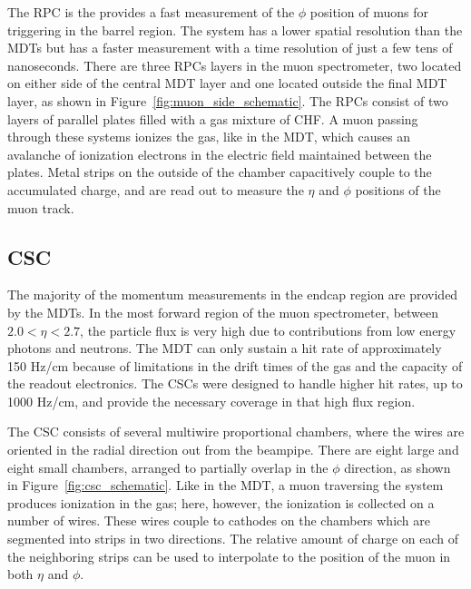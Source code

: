 The \ac{RPC} is the provides a fast measurement of the $\phi$ position of muons for triggering in the barrel region.
The system has a lower spatial resolution than the \acp{MDT} but has a faster measurement with a time resolution of just a few tens of nanoseconds.
There are three \acp{RPC} layers in the muon spectrometer, two located on either side of the central \ac{MDT} layer and one located outside the final \ac{MDT} layer, as shown in Figure~\ref{fig:muon_side_schematic}.
The \acp{RPC} consist of two layers of parallel plates filled with a gas mixture of CHF.
A muon passing through these systems ionizes the gas, like in the \ac{MDT}, which causes an avalanche of ionization electrons in the electric field maintained between the plates.
Metal strips on the outside of the chamber capacitively couple to the accumulated charge, and are read out to measure the $\eta$ and $\phi$ positions of the muon track. 

\subsection{\acl{CSC}}
The majority of the momentum measurements in the endcap region are provided by the \acp{MDT}.
In the most forward region of the muon spectrometer, between $2.0 < \eta < 2.7$, the particle flux is very high due to contributions from low energy photons and neutrons.
The \ac{MDT} can only sustain a hit rate of approximately 150 Hz/cm because of limitations in the drift times of the gas and the capacity of the readout electronics. 
The \acp{CSC} were designed to handle higher hit rates, up to 1000 Hz/cm, and provide the necessary coverage in that high flux region.

The \ac{CSC} consists of several multiwire proportional chambers, where the wires are oriented in the radial direction out from the beampipe.
There are eight large and eight small chambers, arranged to partially overlap in the $\phi$ direction, as shown in Figure~\ref{fig:csc_schematic}.
Like in the \ac{MDT}, a muon traversing the system produces ionization in the gas; here, however, the ionization is collected on a number of wires.
These wires couple to cathodes on the chambers which are segmented into strips in two directions.
The relative amount of charge on each of the neighboring strips can be used to interpolate to the position of the muon in both $\eta$ and $\phi$. 

